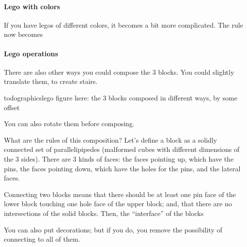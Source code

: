 \paragraph{Lego with colors}

If you have legos of different colors, it becomes a bit more complicated. The rule now becomes


\paragraph{Lego operations}

There are also other ways you could compose the 3 blocks. You could slightly translate them, to create stairs.

todographics{lego figure here: the 3 blocks composed in different ways, by some offset}

You can also rotate them before composing.


What are the rules of this composition? Let's define a block as a solidly connected set of parallelipipedes (malformed cubes with different dimensions of the 3 sides). There are 3 kinds of faces: the faces pointing up, which have the pins, the faces pointing down, which have the holes for the pins, and the lateral faces.

Connecting two blocks means that there should be at least one pin face of the lower block touching one hole face of the upper block; and, that there are no intersections of the solid blocks. Then, the ``interface'' of the blocks


You can also put decorations; but if you do, you remove the possibility of connecting to all of them.



